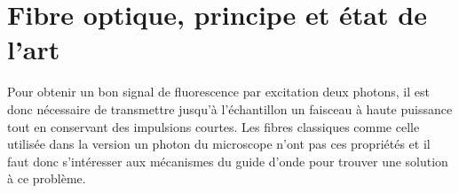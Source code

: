 


\section{Fibre optique, principe et état de l'art}

Pour obtenir un bon signal de fluorescence par excitation deux photons, il est donc nécessaire de transmettre jusqu'à l'échantillon un faisceau à haute puissance tout en conservant des impulsions courtes. Les fibres classiques comme celle utilisée dans la version un photon du microscope n'ont pas ces propriétés et il faut donc s'intéresser aux mécanismes du guide d'onde pour trouver une solution à ce problème.

